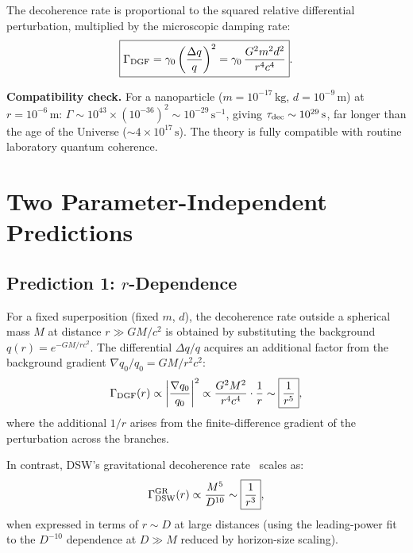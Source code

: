 \documentclass[aps,prl,twocolumn,showpacs,superscriptaddress,preprintnumbers]{revtex4-2}
\begin{document}
The decoherence rate is proportional to the squared relative differential perturbation, multiplied by the microscopic damping rate:
\begin{equation}
\boxed{\Gamma_{\rm DGF} = \gamma_0\left(\frac{\Delta q}{q}\right)^2
= \gamma_0\,\frac{G^2 m^2 d^2}{r^4 c^4}}.
\label{eq:gamma_derived}
\end{equation}

\textbf{Compatibility check.}
For a nanoparticle ($m=10^{-17}\,\mathrm{kg}$, $d=10^{-9}\,\mathrm{m}$) at $r=10^{-6}\,\mathrm{m}$:
$\Gamma\sim10^{43}\times(10^{-36})^2\sim10^{-29}\,\mathrm{s}^{-1}$,
giving $\tau_{\rm dec}\sim10^{29}\,\mathrm{s}$, far longer than the age of the Universe ($\sim4\times10^{17}\,\mathrm{s}$).
The theory is fully compatible with routine laboratory quantum coherence.

\section{Two Parameter-Independent Predictions}

\subsection{Prediction 1: $r$-Dependence}

For a fixed superposition (fixed $m$, $d$), the decoherence rate outside a spherical mass $M$ at distance $r\gg GM/c^2$ is obtained by substituting the background $q(r)=e^{-GM/rc^2}$.
The differential $\Delta q/q$ acquires an additional factor from the background gradient $\nabla q_0/q_0 = GM/r^2 c^2$:
\begin{equation}
\Gamma_{\rm DGF}(r) \propto \left|\frac{\nabla q_0}{q_0}\right|^2
\propto \frac{G^2 M^2}{r^4 c^4} \cdot \frac{1}{r}
\sim \boxed{\frac{1}{r^{5}}},
\label{eq:r_dep_dgf}
\end{equation}
where the additional $1/r$ arises from the finite-difference gradient of the perturbation across the branches.

In contrast, DSW's gravitational decoherence rate~\cite{Danielson:2022a,Danielson:2024} scales as:
\begin{equation}
\Gamma_{\rm DSW}^{\rm GR}(r) \propto \frac{M^{5}}{D^{10}}
\sim \boxed{\frac{1}{r^{3}}},
\label{eq:r_dep_dsw}
\end{equation}
when expressed in terms of $r\sim D$ at large distances (using the leading-power fit to the $D^{-10}$ dependence at $D\gg M$ reduced by horizon-size scaling).
\end{document}
